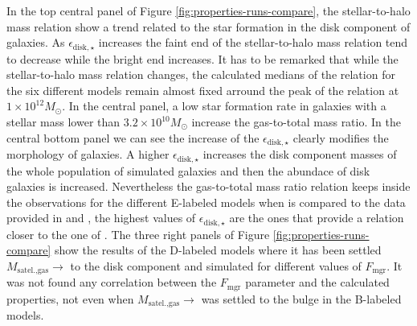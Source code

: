 \documentclass[usenatbib]{mn2e}
\begin{document}
In the top central panel of Figure \ref{fig:properties-runs-compare}, the stellar-to-halo mass relation show a trend related to the star 
formation in the disk component of galaxies. As  $\epsilon_{\text{disk},\star}$  increases the faint end of the stellar-to-halo mass relation tend to 
decrease while the bright end increases. It has to be remarked that while the stellar-to-halo mass relation changes, the calculated medians of the relation 
for the six different models remain almost fixed arround the peak of the relation at $1\times 10^{12}M_{\odot}$. In the central panel,  a low star formation
 rate in galaxies with a stellar mass lower than $3.2\times 10^{10}M_{\odot}$ increase the gas-to-total mass ratio.  In the  central bottom panel we can see 
the increase of the $\epsilon_{\text{disk},\star}$ clearly modifies the morphology of galaxies. A higher  $\epsilon_{\text{disk},\star}$ increases the disk 
component masses of the whole population of simulated galaxies and then the abundace of disk galaxies is increased.  Nevertheless the gas-to-total mass 
ratio relation keeps inside the observations for the different E-labeled models when is compared to the data provided in \cite{2003ApJS..149..289B} and 
\cite{2003ApJ...585L.117B}, the highest values of 
$\epsilon_{\text{disk},\star}$ are the ones that provide a relation  closer to the one of \cite{2010ApJ...710..903M}. The  three right panels of Figure 
\ref{fig:properties-runs-compare} show the results of the D-labeled models where it has been settled $M_{\text{satel.,gas}}\to$ to the disk component and
 simulated for different values of $F_{\text{mgr}}$. It was not found any correlation between the $F_{\text{mgr}}$ parameter and the calculated properties, not even when
 $M_{\text{satel.,gas}}\to$ was settled to the bulge in the B-labeled models.
\end{document}
